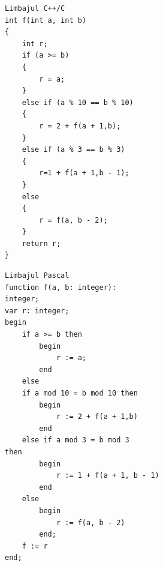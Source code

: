 \documentclass[10pt]{article}
\begin{document}
\begin{verbatim}
Limbajul C++/C
int f(int a, int b)
{
    int r;
    if (a >= b)
    {
        r = a;
    }
    else if (a % 10 == b % 10)
    {
        r = 2 + f(a + 1,b);
    }
    else if (a % 3 == b % 3)
    {
        r=1 + f(a + 1,b - 1);
    }
    else
    {
        r = f(a, b - 2);
    }
    return r;
}
\end{verbatim}

\begin{verbatim}
Limbajul Pascal
function f(a, b: integer):
integer;
var r: integer;
begin
    if a >= b then
        begin
            r := a;
        end
    else
    if a mod 10 = b mod 10 then
        begin
            r := 2 + f(a + 1,b)
        end
    else if a mod 3 = b mod 3
then
        begin
            r := 1 + f(a + 1, b - 1)
        end
    else
        begin
            r := f(a, b - 2)
        end;
    f := r
end;
\end{verbatim}
\end{document}
